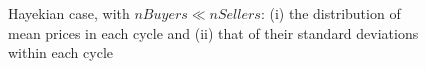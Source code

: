 \documentclass[12pt]{report}
\begin{document}
\begin{appendices}
\begin{figure}[htbp]
\begin{center}
\caption{Hayekian case, with $nBuyers \ll nSellers$: (i) the distribution of mean prices in each cycle and (ii) that of their standard deviations within each cycle}
\label{output_3_2b.png}
\end{center}
\end{figure}



\end{appendices}

\clearpage
{}




\clearpage
{}
\printindex
\end{document}
